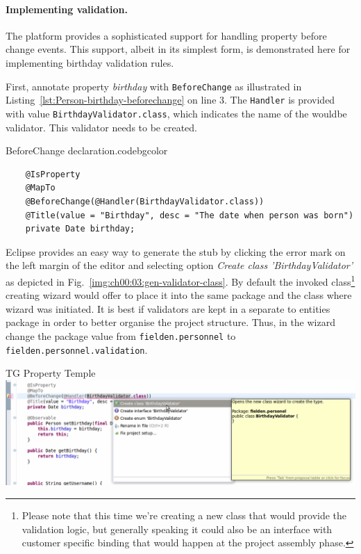   \paragraph*{Implementing validation.}
  The platform provides a sophisticated support for handling property before change events.
  This support, albeit in its simplest form, is demonstrated here for implementing birthday validation rules.

  First, annotate property \emph{birthday} with \texttt{BeforeChange} as illustrated in Listing~\ref{lst:Person-birthday-beforechange} on line 3.
  The \texttt{Handler} is provided with value \texttt{BirthdayValidator.class}, which indicates the name of the wouldbe validator.
  This validator needs to be created.

  \begin{code}{BeforeChange declaration.}{\label{lst:Person-birthday-beforechange}}{codebgcolor}
    \begin{lstlisting}
    @IsProperty
    @MapTo
    @BeforeChange(@Handler(BirthdayValidator.class))
    @Title(value = "Birthday", desc = "The date when person was born")
    private Date birthday;
    \end{lstlisting}
  \end{code}

  Eclipse provides an easy way to generate the stub by clicking the error mark on the left margin of the editor and selecting option \emph{Create class 'BirthdayValidator'} as depicted in Fig.~\ref{img:ch00:03:gen-validator-class}.
  By default the invoked class\footnote{Please note that this time we're creating a new class that would provide the validation logic, but generally speaking it could also be an interface with customer specific binding that would happen at the project assembly phase.} creating wizard would offer to place it into the same package and the class where wizard was initiated.
  It is best if validators are kept in a separate to entities package in order to better organise the project structure.
  Thus, in the wizard change the package value from \texttt{fielden.personnel} to \texttt{fielden.personnel.validation}.

  \begin{image}{TG Property Temple}{\label{img:ch00:03:gen-validator-class}}
    \includegraphics[width=\textwidth]{parts/00-part/chapters/02-making-changes/images/04-create-validator.png}
  \end{image}

